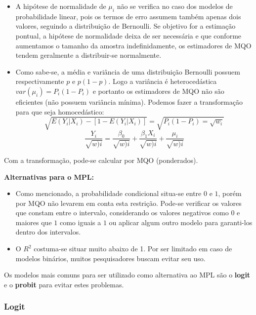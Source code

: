 \documentclass[
  openany]{book}
\begin{document}
\begin{itemize}
\item
  A hipótese de normalidade de \(\mu_i\) não se verifica no caso dos modelos de probabilidade linear, pois os termos de erro assumem também apenas dois valores, seguindo a distribuição de Bernoulli. Se objetivo for a estimação pontual, a hipótese de normalidade deixa de ser necessária \citep{gujarati2011econometria} e que conforme aumentamos o tamanho da amostra indefinidamente, os estimadores de MQO tendem geralmente a distribuir-se normalmente.
\item
  Como sabe-se, a média e variância de uma distribuição Bernoulli possuem respectivamente \(p\) e \(p(1-p)\). Logo a variância é heterocedástica \(var(\mu_i)=P_i(1-P_i)\) e portanto os estimadores de MQO não são eficientes (não possuem variância mínima). Podemos fazer a transformação para que seja homocedástico:
  \[\sqrt{E(Y_i|X_i)-[1-E(Y_i|X_i)]}=\sqrt{P_i(1-P_i)=\sqrt{w_i}}\]
  \begin{equation}
    \frac{Y_i}{\sqrt{w)i}} = \frac{\beta_0}{\sqrt{w)i}}+\frac{\beta_1 X_i}{\sqrt{w)i}}+\frac{\mu_i}{\sqrt{w)i}}
    \label{eq:probhomecedastico}
  \end{equation}
\end{itemize}

Com a transformação, pode-se calcular por MQO (ponderados).

\textbf{Alternativas para o MPL:}

\begin{itemize}
\item
  Como mencionado, a probabilidade condicional situa-se entre \(0\) e \(1\), porém por MQO não levarem em conta esta restrição. Pode-se verificar os valores que constam entre o intervalo, considerando os valores negativos como \(0\) e maiores que \(1\) como iguais a \(1\) ou aplicar algum outro modelo para garanti-los dentro dos intervalos.
\item
  O \(R^2\) costuma-se situar muito abaixo de 1. Por ser limitado em caso de modelos binários, muitos pesquisadores buscam evitar seu uso.
\end{itemize}

Os modelos mais comuns para ser utilizado como alternativa ao MPL são o \textbf{logit} e o \textbf{probit} para evitar estes problemas.

\hypertarget{logit}{%
\subsubsection{Logit}\label{logit}}
\end{document}
